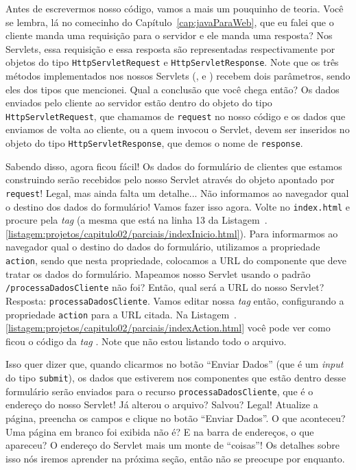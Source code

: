 Antes de escrevermos nosso código, vamos a mais um pouquinho de teoria. Você se lembra, lá no comecinho do Capítulo~\ref{cap:javaParaWeb}, que eu falei que o cliente manda uma requisição para o servidor e ele manda uma resposta? Nos Servlets, essa requisição e essa resposta são representadas respectivamente por objetos do tipo \texttt{HttpServletRequest} e \texttt{HttpServletResponse}. Note que os três métodos implementados nos nossos Servlets (,  e ) recebem dois parâmetros, sendo eles dos tipos que mencionei. Qual a conclusão que você chega então? Os dados enviados pelo cliente ao servidor estão dentro do objeto do tipo \texttt{HttpServletRequest}, que chamamos de \texttt{request} no nosso código e os dados que enviamos de volta ao cliente, ou a quem invocou o Servlet, devem ser inseridos no objeto do tipo \texttt{HttpServletResponse}, que demos o nome de \texttt{response}.

Sabendo disso, agora ficou fácil! Os dados do formulário de clientes que estamos construindo serão recebidos pelo nosso Servlet através do objeto apontado por \texttt{request}! Legal, mas ainda falta um detalhe... Não informamos ao navegador qual o destino dos dados do formulário! Vamos fazer isso agora. Volte no \texttt{index.html} e procure pela \textit{tag}  (a mesma que está na linha 13 da Listagem~\thechapter.\ref{listagem:projetos/capitulo02/parciais/indexInicio.html}). Para informarmos ao navegador qual o destino do dados do formulário, utilizamos a propriedade \texttt{action}, sendo que nesta propriedade, colocamos a URL do componente que deve tratar os dados do formulário. Mapeamos nosso Servlet usando o padrão \texttt{/processaDadosCliente} não foi? Então, qual será a URL do nosso Servlet? Resposta: \texttt{processaDadosCliente}. Vamos editar nossa \textit{tag}  então, configurando a propriedade \texttt{action} para a URL citada. Na Listagem~\thechapter.\ref{listagem:projetos/capitulo02/parciais/indexAction.html} você pode ver como ficou o código da \textit{tag} . Note que não estou listando todo o arquivo.


Isso quer dizer que, quando clicarmos no botão ``Enviar Dados'' (que é um \textit{input} do tipo \texttt{submit}), os dados que estiverem nos componentes que estão dentro desse formulário serão enviados para o recurso \texttt{processaDadosCliente}, que é o endereço do nosso Servlet! Já alterou o arquivo? Salvou? Legal! Atualize a página, preencha os campos e clique no botão ``Enviar Dados''. O que aconteceu? Uma página em branco foi exibida não é? E na barra de endereços, o que apareceu? O endereço do Servlet mais um monte de ``coisas''! Os detalhes sobre isso nós iremos aprender na próxima seção, então não se preocupe por enquanto.

